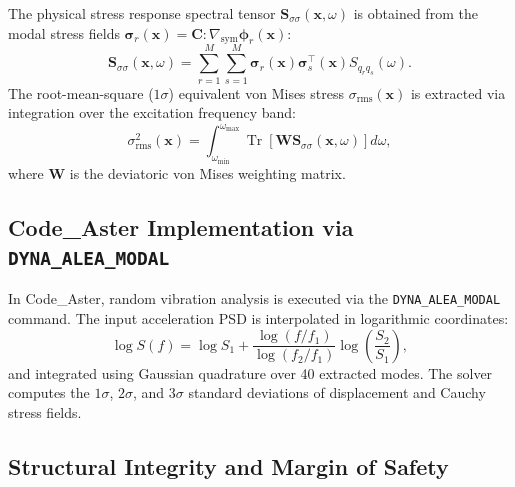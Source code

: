 The physical stress response spectral tensor $\mathbf{S}_{\sigma\sigma}(\mathbf{x}, \omega)$ is obtained from the modal stress fields $\boldsymbol{\sigma}_r(\mathbf{x}) = \mathbf{C} : \nabla_{\text{sym}} \boldsymbol{\phi}_r(\mathbf{x})$:
\begin{equation}
\mathbf{S}_{\sigma\sigma}(\mathbf{x}, \omega) = \sum_{r=1}^M \sum_{s=1}^M \boldsymbol{\sigma}_r(\mathbf{x}) \boldsymbol{\sigma}_s^\top(\mathbf{x}) S_{q_r q_s}(\omega).
\label{eq:stress_spectral_density}
\end{equation}
The root-mean-square ($1\sigma$) equivalent von Mises stress $\sigma_{\text{rms}}(\mathbf{x})$ is extracted via integration over the excitation frequency band:
\begin{equation}
\sigma_{\text{rms}}^2(\mathbf{x}) = \int_{\omega_{\min}}^{\omega_{\max}} \operatorname{Tr}\left[ \mathbf{W} \mathbf{S}_{\sigma\sigma}(\mathbf{x}, \omega) \right] d\omega,
\label{eq:sigma_rms_integral}
\end{equation}
where $\mathbf{W}$ is the deviatoric von Mises weighting matrix.

\subsection{Code\_Aster Implementation via \texttt{DYNA\_ALEA\_MODAL}}

In Code\_Aster, random vibration analysis is executed via the \texttt{DYNA\_ALEA\_MODAL} command. The input acceleration PSD is interpolated in logarithmic coordinates:
\begin{equation}
\log S(f) = \log S_1 + \frac{\log(f/f_1)}{\log(f_2/f_1)} \log\left(\frac{S_2}{S_1}\right),
\end{equation}
and integrated using Gaussian quadrature over 40 extracted modes. The solver computes the $1\sigma$, $2\sigma$, and $3\sigma$ standard deviations of displacement and Cauchy stress fields.

\subsection{Structural Integrity and Margin of Safety}

